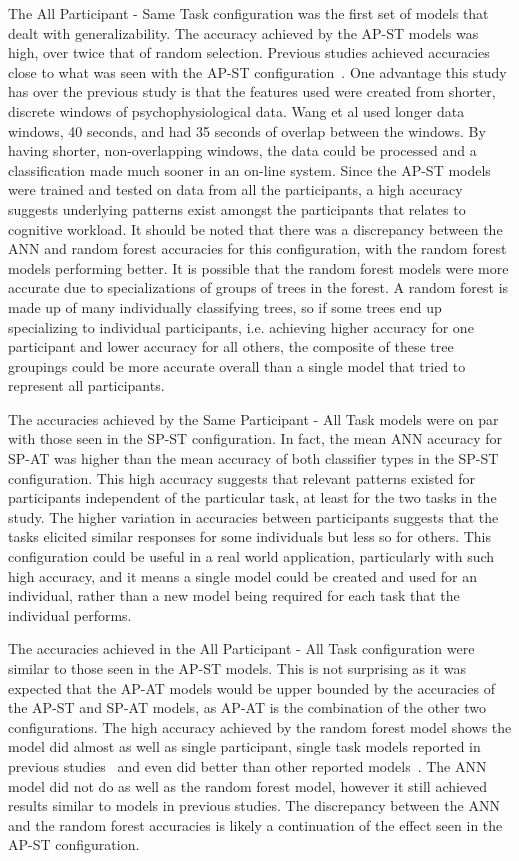 \documentclass[11pt]{article}
\begin{document}
	The All Participant - Same Task configuration was the first set of models that dealt with generalizability. The accuracy achieved by the AP-ST models was high, over twice that of random selection. Previous studies achieved accuracies close to what was seen with the AP-ST configuration~\cite{Wang_Z}. One advantage this study has over the previous study is that the features used were created from shorter, discrete windows of psychophysiological data. Wang et al used longer data windows, 40 seconds, and had 35 seconds of overlap between the windows. By having shorter, non-overlapping windows, the data could be processed and a classification made much sooner in an on-line system. Since the AP-ST models were trained and tested on data from all the participants, a high accuracy suggests underlying patterns exist amongst the participants that relates to cognitive workload. It should be noted that there was a discrepancy between the ANN and random forest accuracies for this configuration, with the random forest models performing better. It is possible that the random forest models were more accurate due to specializations of groups of trees in the forest. A random forest is made up of many individually classifying trees, so if some trees end up specializing to individual participants, i.e. achieving higher accuracy for one participant and lower accuracy for all others, the composite of these tree groupings could be more accurate overall than a single model that tried to represent all participants. 
	
	The accuracies achieved by the Same Participant - All Task models were on par with those seen in the SP-ST configuration. In fact, the mean ANN accuracy for SP-AT was higher than the mean accuracy of both classifier types in the SP-ST configuration.  This high accuracy suggests that relevant patterns existed for participants independent of the particular task, at least for the two tasks in the study. The higher variation in accuracies between participants suggests that the tasks elicited similar responses for some individuals but less so for others. This configuration could be useful in a real world application, particularly with such high accuracy, and it means a single model could be created and used for an individual, rather than a new model being required for each task that the individual performs. 
	
	The accuracies achieved in the All Participant  - All Task configuration were similar to those seen in the AP-ST models. This is not surprising as it was expected that the AP-AT models would be upper bounded by the accuracies of the AP-ST and SP-AT models, as AP-AT is the combination of the other two configurations. The high accuracy achieved by the random forest model shows the model did almost as well as single participant, single task models reported in previous studies~\cite{Yin} and even did better than other reported models~\cite{Zhang}. The ANN model did not do as well as the random forest model, however it still achieved results similar to models in previous studies. The discrepancy between the ANN and the random forest accuracies is likely a continuation of the effect seen in the AP-ST configuration.
	
\end{document}
